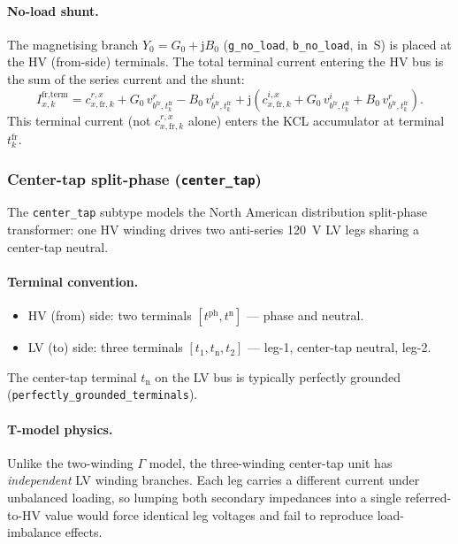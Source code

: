 \documentclass[11pt,a4paper]{article}
\newcommand{\vr}[2]{v^r_{#1,#2}}
\newcommand{\vi}[2]{v^i_{#1,#2}}
\begin{document}
\paragraph{No-load shunt.}
The magnetising branch $Y_0 = G_0 + \mathrm{j}B_0$
(\texttt{g\_no\_load}, \texttt{b\_no\_load}, in~S) is placed at the HV
(from-side) terminals.  The total terminal current entering the HV bus
is the sum of the series current and the shunt:
%
\begin{equation}
  I^\text{fr,term}_{x,k} = c^{r,x}_{x,\text{fr},k}
    + G_0\,\vr{b^\text{fr}}{t^\text{fr}_k}
    - B_0\,\vi{b^\text{fr}}{t^\text{fr}_k}
    + \mathrm{j}\!\left(c^{i,x}_{x,\text{fr},k}
    + G_0\,\vi{b^\text{fr}}{t^\text{fr}_k}
    + B_0\,\vr{b^\text{fr}}{t^\text{fr}_k}\right).
  \label{eq:yy-shunt}
\end{equation}
%
This terminal current (not $c^{r,x}_{x,\text{fr},k}$ alone) enters the KCL
accumulator at terminal $t^\text{fr}_k$.

\subsubsection*{Center-tap split-phase (\texttt{center\_tap})}

The \texttt{center\_tap} subtype models the North American distribution
split-phase transformer: one HV winding drives two anti-series 120~V LV legs
sharing a center-tap neutral.

\paragraph{Terminal convention.}
\begin{itemize}
  \item HV (from) side: two terminals $[t^\text{ph}, t^\text{n}]$ —
        phase and neutral.
  \item LV (to) side: three terminals $[t_1, t_\text{n}, t_2]$ —
        leg-1, center-tap neutral, leg-2.
\end{itemize}
The center-tap terminal $t_\text{n}$ on the LV bus is typically
perfectly grounded (\texttt{perfectly\_grounded\_terminals}).

\paragraph{T-model physics.}
Unlike the two-winding $\Gamma$ model, the three-winding center-tap unit has
\emph{independent} LV winding branches.  Each leg carries a different current
under unbalanced loading, so lumping both secondary impedances into a single
referred-to-HV value would force identical leg voltages and fail to reproduce
load-imbalance effects.
\end{document}
